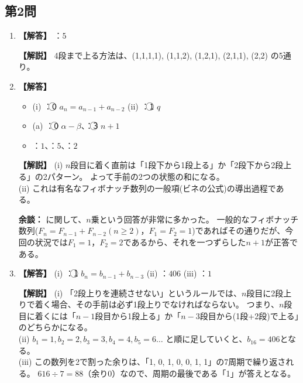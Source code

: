 \documentclass[uplatex,dvipdfmx,paper=a4paper,fontsize=11pt,jafontscale=0.9247,lang=ja]{jlreq}
\begin{document}
\subsection*{第2問}
\begin{enumerate}[label=(\arabic*)]
  \item \textbf{【解答】} ：$5$
    
    \textbf{【解説】}
    4段まで上る方法は、(1,1,1,1), (1,1,2), (1,2,1), (2,1,1), (2,2) の5通り。

  \item \textbf{【解答】}
    \begin{itemize}[label={}, leftmargin=1em]
        \item (i) ：\textcircled{\scriptsize 0} $a_n = a_{n-1} + a_{n-2}$ \quad (ii) ：\textcircled{\scriptsize 1} $q$
        \item (a) ：\textcircled{\scriptsize 0} $\alpha - \beta$、：\textcircled{\scriptsize 3} $n+1$
        \item {}：$1$、：$5$、：$2$
    \end{itemize}

    \textbf{【解説】}
    (i) $n$段目に着く直前は「1段下から1段上る」か「2段下から2段上る」の2パターン。
    よって手前の2つの状態の和になる。\\
    (ii) これは有名なフィボナッチ数列の一般項(ビネの公式)の導出過程である。
    
    \textbf{余談：} に関して、$n$乗という回答が非常に多かった。
    一般的なフィボナッチ数列($F_n=F_{n-1}+F_{n-2}(n\geq2)，F_1=F_2=1$)であればその通りだが、今回の状況では$F_1=1，F_2=2$であるから、それを一つずらした$n+1$が正答である。

  \item \textbf{【解答】} (i) ：\textcircled{\scriptsize 1} $b_n = b_{n-1} + b_{n-3}$ \quad (ii) ：$406$ \quad (iii) ：$1$

    \textbf{【解説】}
    (i) 「2段上りを連続させない」というルールでは、$n$段目に2段上りで着く場合、その手前は必ず1段上りでなければならない。
    つまり、$n$段目に着くには「$n-1$段目から1段上る」か「$n-3$段目から(1段+2段)で上る」のどちらかになる。\\
    (ii) $b_1=1, b_2=2, b_3=3, b_4=4, b_5=6 \dots$ と順に足していくと、$b_{16} = 406$となる。\\
    (iii) この数列を2で割った余りは、「1, 0, 1, 0, 0, 1, 1」の7周期で繰り返される。
    $616 \div 7 = 88$（余り0）なので、周期の最後である「1」が答えとなる。
\end{enumerate}
\end{document}
